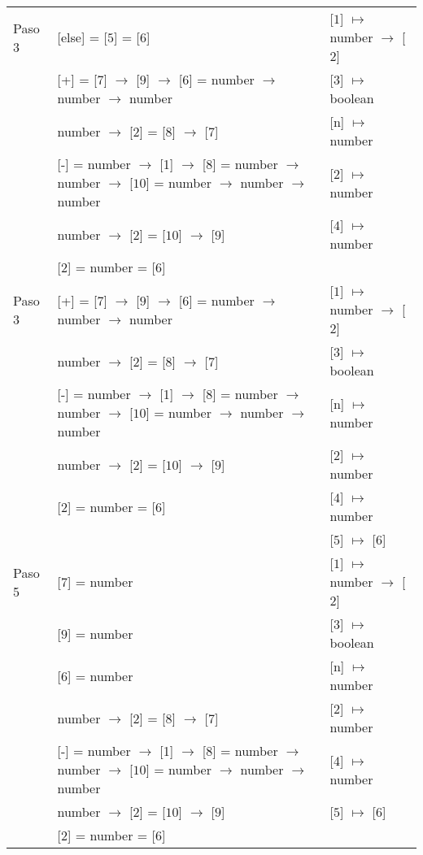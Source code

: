 \documentclass{article}
\begin{document}
\begin{center}
\begin{longtable}{ | l | p{10 cm} | p{5 cm} | }
 Paso 3  & [else] = [$\boxed{5}$] = [$\boxed{6}$]										& [$\boxed{1}$] $\mapsto$ number $\rightarrow$ [$\boxed{2}$]	\\
	 & [+] = [$\boxed{7}$] $\rightarrow$ [$\boxed{9}$] $\rightarrow$ [$\boxed{6}$] = 
	 number $\rightarrow$ number $\rightarrow$ number									& [$\boxed{3}$] $\mapsto$ boolean	\\ 
	 & number $\rightarrow$ [$\boxed{2}$] = [$\boxed{8}$] $\rightarrow$ [$\boxed{7}$]					& [n] $\mapsto$ number	\\
	 & [-] = number $\rightarrow$ [1] $\rightarrow$ [$\boxed{8}$] = number $\rightarrow$ number $\rightarrow$ [$\boxed{10}$] =
	   number $\rightarrow$ number $\rightarrow$ number									& [2] $\mapsto$ number	\\
	 & number $\rightarrow$ [$\boxed{2}$] = [$\boxed{10}$] $\rightarrow$ [$\boxed{9}$] 					& [$\boxed{4}$] $\mapsto$ number	\\ 
	 & [$\boxed{2}$] = number = [$\boxed{6}$]										&	\\ \hline
	 
 Paso 3  & [+] = [$\boxed{7}$] $\rightarrow$ [$\boxed{9}$] $\rightarrow$ [$\boxed{6}$] = 
	 number $\rightarrow$ number $\rightarrow$ number									& [$\boxed{1}$] $\mapsto$ number $\rightarrow$ [$\boxed{2}$]	\\ 
	 & number $\rightarrow$ [$\boxed{2}$] = [$\boxed{8}$] $\rightarrow$ [$\boxed{7}$]					& [$\boxed{3}$] $\mapsto$ boolean	\\
	 & [-] = number $\rightarrow$ [1] $\rightarrow$ [$\boxed{8}$] = number $\rightarrow$ number $\rightarrow$ [$\boxed{10}$] =
	   number $\rightarrow$ number $\rightarrow$ number									& [n] $\mapsto$ number	\\
	 & number $\rightarrow$ [$\boxed{2}$] = [$\boxed{10}$] $\rightarrow$ [$\boxed{9}$] 					& [2] $\mapsto$ number	\\ 
	 & [$\boxed{2}$] = number = [$\boxed{6}$]										& [$\boxed{4}$] $\mapsto$ number	\\ 
	 &	& [$\boxed{5}$] $\mapsto$ [$\boxed{6}$] \\ \hline
	 
 Paso 5  & [$\boxed{7}$] = number												& [$\boxed{1}$] $\mapsto$ number $\rightarrow$ [$\boxed{2}$] \\
	 & [$\boxed{9}$] = number												& [$\boxed{3}$] $\mapsto$ boolean \\
	 & [$\boxed{6}$] = number												& [n] $\mapsto$ number	\\ 
	 & number $\rightarrow$ [$\boxed{2}$] = [$\boxed{8}$] $\rightarrow$ [$\boxed{7}$]					& [2] $\mapsto$ number	\\
	 & [-] = number $\rightarrow$ [1] $\rightarrow$ [$\boxed{8}$] = number $\rightarrow$ number $\rightarrow$ [$\boxed{10}$] =
	   number $\rightarrow$ number $\rightarrow$ number									& [$\boxed{4}$] $\mapsto$ number	\\
	 & number $\rightarrow$ [$\boxed{2}$] = [$\boxed{10}$] $\rightarrow$ [$\boxed{9}$] 					& [$\boxed{5}$] $\mapsto$ [$\boxed{6}$]	\\ 
	 & [$\boxed{2}$] = number = [$\boxed{6}$]										& 	\\ \hline
	 

\end{longtable}
\end{center}
\end{document}
